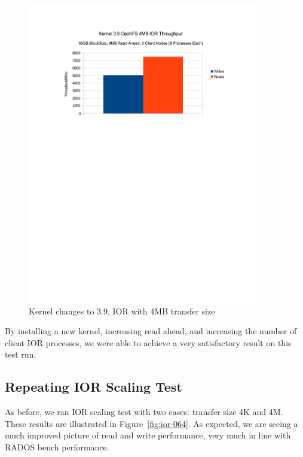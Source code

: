 \documentclass{article}
\begin{document}
\begin{figure}[htb]
\centering
\includegraphics[width=4in]{ior-kernel-39}
\caption{Kernel changes to 3.9, IOR with 4MB transfer size}
\label{fig:ior-kernel-39}
\end{figure}


By installing a new kernel, increasing read ahead, and increasing the number of
client IOR processes, we were able to achieve a very satisfactory result on this
test run.


\subsection{Repeating IOR Scaling Test}

As before, we ran IOR scaling test with two cases: transfer size 4K and 4M.
These results are illustrated in Figure~\ref{fig:ior-064}. As expected, we are
seeing a much improved picture of read and write performance, very much in
line with RADOS bench performance.
\end{document}
